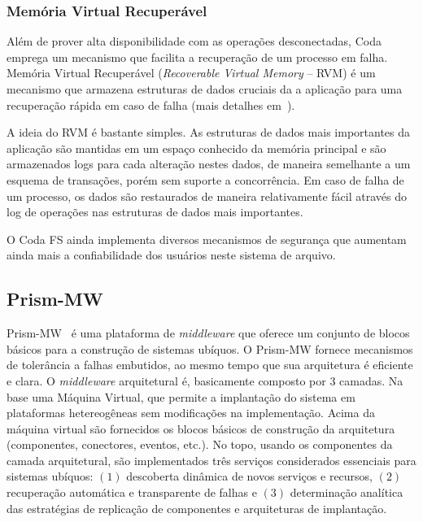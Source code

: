 \subsubsection*{Memória Virtual Recuperável}
Além de prover alta disponibilidade com as operações desconectadas, Coda emprega um mecanismo que facilita a recuperação de um processo em falha. Memória Virtual Recuperável (\emph{Recoverable Virtual Memory} -- RVM) é um mecanismo que armazena estruturas de dados cruciais da a aplicação para uma recuperação rápida em caso de falha (mais detalhes em~\cite{satyanarayanan1994lightweight}).

A ideia do RVM é bastante simples. As estruturas de dados mais importantes da aplicação são mantidas em um espaço conhecido da memória principal e são armazenados logs para cada alteração nestes dados, de maneira semelhante a um esquema de transações, porém sem suporte a concorrência. Em caso de falha de um processo, os dados são restaurados de maneira relativamente fácil através do log de operações nas estruturas de dados mais importantes.

O Coda FS ainda implementa diversos mecanismos de segurança que aumentam ainda mais a confiabilidade dos usuários neste sistema de arquivo.


\subsection{Prism-MW} %
\label{sub:prism_mw}

Prism-MW~\cite{Seo07} é uma plataforma de \emph{middleware} que oferece um conjunto de blocos básicos para a construção de sistemas ubíquos. O Prism-MW fornece mecanismos de tolerância a falhas embutidos, ao mesmo tempo que sua arquitetura é eficiente e clara. O \emph{middleware} arquitetural é, basicamente composto por 3 camadas. Na base uma Máquina Virtual, que permite a implantação do sistema em plataformas hetereogêneas sem modificações na implementação. Acima da máquina virtual são fornecidos os blocos básicos de construção da arquitetura (componentes, conectores, eventos, etc.). No topo, usando os componentes da camada arquitetural, são implementados três serviços considerados essenciais para sistemas ubíquos: $(1)$ descoberta dinâmica de novos serviços e recursos, $(2)$ recuperação automática e transparente de falhas e $(3)$ determinação analítica das estratégias de replicação de componentes e arquiteturas de implantação.

